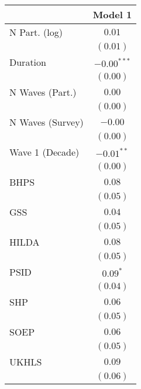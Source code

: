 
\begin{table}
\begin{center}
\begin{tabular}{l c}
\hline
 & Model 1 \\
\hline
N Part. (log)                              & $0.01$        \\
                                           & $(0.01)$      \\
Duration                                   & $-0.00^{***}$ \\
                                           & $(0.00)$      \\
N Waves (Part.)                            & $0.00$        \\
                                           & $(0.00)$      \\
N Waves (Survey)                           & $-0.00$       \\
                                           & $(0.00)$      \\
Wave 1 (Decade)                            & $-0.01^{**}$  \\
                                           & $(0.00)$      \\
BHPS                                       & $0.08$        \\
                                           & $(0.05)$      \\
GSS                                        & $0.04$        \\
                                           & $(0.05)$      \\
HILDA                                      & $0.08$        \\
                                           & $(0.05)$      \\
PSID                                       & $0.09^{*}$    \\
                                           & $(0.04)$      \\
SHP                                        & $0.06$        \\
                                           & $(0.05)$      \\
SOEP                                       & $0.06$        \\
                                           & $(0.05)$      \\
UKHLS                                      & $0.09$        \\
                                           & $(0.06)$      \\

\end{tabular}
\end{center}
\end{table}
